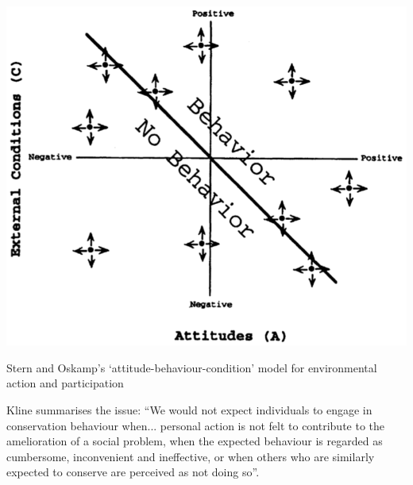 \documentclass[nofonts,nols,justified,nobib]{tufte-book}
\begin{document}
\begin{marginfigure}
\includegraphics[width=\textwidth]{img/1/attitude-condition.png}
\caption{Stern and Oskamp's `attitude-behaviour-condition' model for environmental action and participation \cite{stern_managing_1987}}
\end{marginfigure}

Kline \cite{kline_rationalizing_1988} summarises the issue: ``We would not expect individuals to engage in conservation behaviour when... personal action is not felt to contribute to the amelioration of a social problem, when the expected behaviour is regarded as cumbersome, inconvenient and ineffective, or when others who are similarly expected to conserve are perceived as not doing so''.
\end{document}
